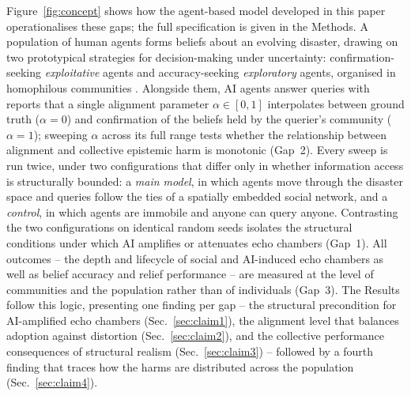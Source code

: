 \documentclass[pdflatex,sn-nature]{sn-jnl}
\begin{document}
Figure~\ref{fig:concept} shows how the agent-based model developed in this paper operationalises these gaps; the full specification is given in the Methods. A population of human agents forms beliefs about an evolving disaster, drawing on two prototypical strategies for decision-making under uncertainty: confirmation-seeking \emph{exploitative} agents and accuracy-seeking \emph{exploratory} agents, organised in homophilous communities \citep{mcpherson2001birds,comes2020coordination}. Alongside them, AI agents answer queries with reports that a single alignment parameter $\alpha \in [0,1]$ interpolates between ground truth ($\alpha = 0$) and confirmation of the beliefs held by the querier's community ($\alpha = 1$); sweeping $\alpha$ across its full range tests whether the relationship between alignment and collective epistemic harm is monotonic (Gap~2). Every sweep is run twice, under two configurations that differ only in whether information access is structurally bounded: a \emph{main model}, in which agents move through the disaster space and queries follow the ties of a spatially embedded social network, and a \emph{control}, in which agents are immobile and anyone can query anyone. Contrasting the two configurations on identical random seeds isolates the structural conditions under which AI amplifies or attenuates echo chambers (Gap~1). All outcomes -- the depth and lifecycle of social and AI-induced echo chambers as well as belief accuracy and relief performance -- are measured at the level of communities and the population rather than of individuals (Gap~3). The Results follow this logic, presenting one finding per gap -- the structural precondition for AI-amplified echo chambers (Sec.~\ref{sec:claim1}), the alignment level that balances adoption against distortion (Sec.~\ref{sec:claim2}), and the collective performance consequences of structural realism (Sec.~\ref{sec:claim3}) -- followed by a fourth finding that traces how the harms are distributed across the population (Sec.~\ref{sec:claim4}).
\end{document}
